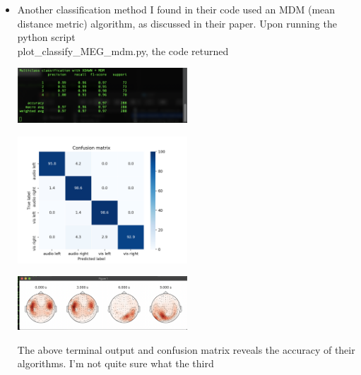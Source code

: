 \documentclass[12pt,letterpaper,boxed]{math_hw_pset}
\begin{document}
\begin{solution}
\begin{itemize}
        \item Another classification method I found in their code used 
        an MDM (mean distance metric) algorithm, as discussed in their paper. 
        Upon running the python script \\
        plot\_classify\_MEG\_mdm.py, the code returned 
        \begin{center}
            \includegraphics[width = 0.5\textwidth]{plot_classify_MEG_mdm2.png}
        \end{center}
        \begin{center}
            \includegraphics[width = 0.5\textwidth]{plot_classify_MEG1.png}
        \end{center}
        \begin{center}
            \includegraphics[width = 0.5\textwidth]{plot_classify_MEG_mdm3.png}
        \end{center}
        The above terminal output and confusion matrix reveals the accuracy of 
        their algorithms. I'm not quite sure what the third  


\end{itemize}
\end{solution}
\end{document}
